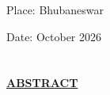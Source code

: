 \documentclass{article}
\begin{document}
\begin{flushleft}
Place: Bhubaneswar
\end{flushleft}
\begin{flushleft}
Date: October 2026
\end{flushleft}

\newpage

\section*{}
\begin{center}
\underline{\LARGE \textbf{ABSTRACT}}\\[1.0cm]
\end{center}
\end{document}
